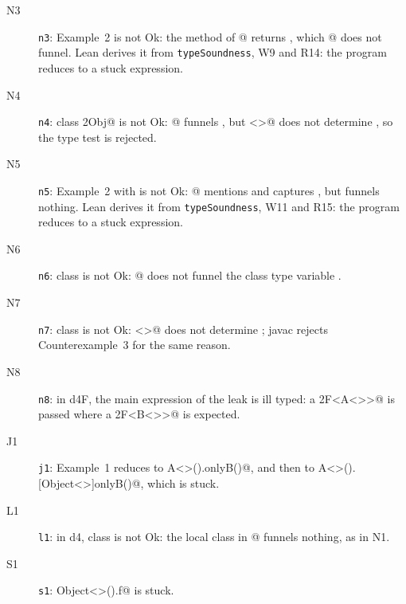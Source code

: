 \begin{description}
\item[N3] \texttt{n3}: Example~2 is not Ok: the method \Q@x@ of @ returns \Q@X@, which @ does not funnel.
Lean derives it from \texttt{typeSoundness}, W9 and R14: the program reduces to a stuck expression.
\item[N4] \texttt{n4}: class \Q@Fixed2Obj@ is not Ok: @ funnels \Q@X@, but \Q@Object<>@ does not determine \Q@X@, so the type test is rejected.
\item[N5] \texttt{n5}: Example~2 with \Q@show@ is not Ok: @ mentions \Q@X@ and captures \Q@f@, but funnels nothing.
Lean derives it from \texttt{typeSoundness}, W11 and R15: the program reduces to a stuck expression.
\item[N6] \texttt{n6}: class \Q@NotBroken@ is not Ok: @ does not funnel the class type variable \Q@X@.
\item[N7] \texttt{n7}: class \Q@NotBrokenF@ is not Ok: \Q@Object<>@ does not determine \Q@X@; javac rejects Counterexample~3 for the same reason.
\item[N8] \texttt{n8}: in d4F, the main expression of the leak is ill typed: a \Q@MyFoo2F<A<>>@ is passed where a \Q@MyFoo2F<B<>>@ is expected.
\item[J1] \texttt{j1}: Example~1 reduces to \Q@new A<>().onlyB()@, and then to \Q@new A<>().[Object<>]onlyB()@, which is stuck.
\item[L1] \texttt{l1}: in d4, class \Q@Broken@ is not Ok: the local class in @ funnels nothing, as in N1.
\item[S1] \texttt{s1}: \Q@new Object<>().f@ is stuck.
\end{description}
